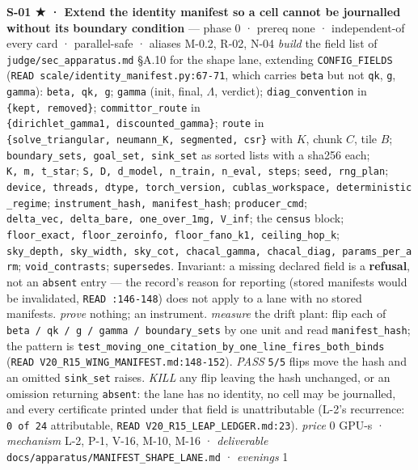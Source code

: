 \documentclass[11pt,a4paper]{article}
\newcounter{none}                 %
\theoremstyle{plain}
\theoremstyle{definition}
\theoremstyle{remark}
\begin{document}
\textbf{S-01 ★ · Extend the identity manifest so a cell cannot be
journalled without its boundary condition} --- phase 0 · prereq none ·
independent-of every card · parallel-safe · aliases M-0.2, R-02, N-04
\emph{build} the field list of \texttt{judge/sec\_apparatus.md} §A.10
for the shape lane, extending \texttt{CONFIG\_FIELDS}
(\texttt{READ\ scale/identity\_manifest.py:67-71}, which carries
\texttt{beta} but not \texttt{qk}, \texttt{g}, \texttt{gamma}):
\texttt{beta,\ qk,\ g}; \texttt{gamma} (init, final, \(\Lambda\),
verdict); \texttt{diag\_convention} in \texttt{\{kept,\ removed\}};
\texttt{committor\_route} in
\texttt{\{dirichlet\_gamma1,\ discounted\_gamma\}}; \texttt{route} in
\texttt{\{solve\_triangular,\ neumann\_K,\ segmented,\ csr\}} with
\(K\), chunk \(C\), tile \(B\);
\texttt{boundary\_sets,\ goal\_set,\ sink\_set} as sorted lists with a
sha256 each; \texttt{K,\ m,\ t\_star};
\texttt{S,\ D,\ d\_model,\ n\_train,\ n\_eval,\ steps};
\texttt{seed,\ rng\_plan};
\texttt{device,\ threads,\ dtype,\ torch\_version,\ cublas\_workspace,\ deterministic\_regime};
\texttt{instrument\_hash,\ manifest\_hash}; \texttt{producer\_cmd};
\texttt{delta\_vec,\ delta\_bare,\ one\_over\_1mg,\ V\_inf}; the
\texttt{census} block;
\texttt{floor\_exact,\ floor\_zeroinfo,\ floor\_fano\_k1,\ ceiling\_hop\_k};
\texttt{sky\_depth,\ sky\_width,\ sky\_cot,\ chacal\_gamma,\ chacal\_diag,\ params\_per\_arm};
\texttt{void\_contrasts}; \texttt{supersedes}. Invariant: a missing
declared field is a \textbf{refusal}, not an \texttt{absent} entry ---
the record's reason for reporting (stored manifests would be
invalidated, \texttt{READ\ :146-148}) does not apply to a lane with no
stored manifests. \emph{prove} nothing; an instrument. \emph{measure}
the drift plant: flip each of
\texttt{beta\ /\ qk\ /\ g\ /\ gamma\ /\ boundary\_sets} by one unit and
read \texttt{manifest\_hash}; the pattern is
\texttt{test\_moving\_one\_citation\_by\_one\_line\_fires\_both\_binds}
(\texttt{READ\ V20\_R15\_WING\_MANIFEST.md:148-152}). \emph{PASS}
\texttt{5/5} flips move the hash and an omitted \texttt{sink\_set}
raises. \emph{KILL} any flip leaving the hash unchanged, or an omission
returning \texttt{absent}: the lane has no identity, no cell may be
journalled, and every certificate printed under that field is
unattributable (L-2's recurrence: \texttt{0\ of\ 24} attributable,
\texttt{READ\ V20\_R15\_LEAP\_LEDGER.md:23}). \emph{price} \(0\) GPU-s ·
\emph{mechanism} L-2, P-1, V-16, M-10, M-16 · \emph{deliverable}
\texttt{docs/apparatus/MANIFEST\_SHAPE\_LANE.md} · \emph{evenings} 1
\end{document}
